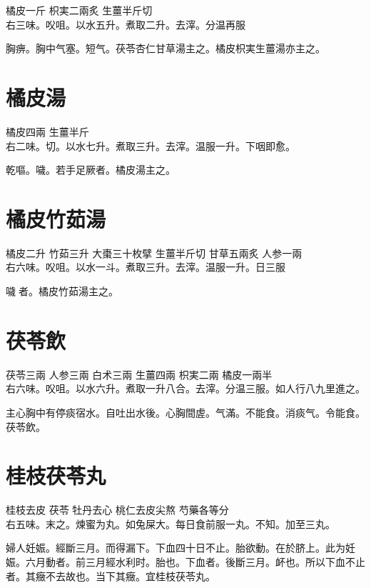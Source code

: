 橘皮{\scriptsize 一斤} 枳実{\scriptsize 二兩炙} 生薑{\scriptsize 半斤切}\\
右三味。㕮咀。以水五升。煮取二升。去滓。分温再服

胸痹。胸中气塞。短气。茯苓杏仁甘草湯主之。橘{\khaaitp 皮}枳{\khaaitp 実生}薑湯亦主之。

\section{橘皮湯}

橘皮{\scriptsize 四兩} 生薑{\scriptsize 半斤}\\
右二味。切。以水七升。煮取三升。去滓。温服一升。下咽即愈。

乾嘔。噦。若手足厥者。橘皮湯主之。

\section{橘皮竹茹湯}

橘皮{\scriptsize 二升} 竹茹{\scriptsize 三升} 大棗{\scriptsize 三十枚擘} 生薑{\scriptsize 半斤切} 甘草{\scriptsize 五兩炙} 人参{\scriptsize 一兩}\\
右六味。㕮咀。以水一斗。煮取三升。去滓。温服一升。日三服

噦{\sungtpii 𠱘}者。橘皮竹茹湯主之。

\section{茯苓飲}

茯苓{\scriptsize 三兩} 人参{\scriptsize 三兩} 白术{\scriptsize 三兩} 生薑{\scriptsize 四兩} 枳実{\scriptsize 二兩} 橘皮{\scriptsize 一兩半}\\
右六味。㕮咀。以水六升。煮取一升八合。去滓。分温三服。如人行八九里進之。

主心胸中有停痰宿水。自吐出水後。心胸間虗。气滿。不能食。消痰气。令能食。茯苓飲。

\section{桂枝茯苓丸}

桂枝{\scriptsize 去皮} 茯苓{ }牡丹{\scriptsize 去心} 桃仁{\scriptsize 去皮尖熬} 芍藥{\scriptsize 各等分}\\
右五味。末之。煉蜜为丸。如兔屎大。每日{\khaaitp 食前服}一丸。不知。加至三丸。

婦人妊娠。經斷三月。而得漏下。下血四十日不止。胎欲動。在於脐上。此为妊娠。六月動者。前三月經水利时。胎也。下血者。後斷三月。衃也。所以下血不止者。其癥不去故也。当下其癥。宜桂枝茯苓丸。{\wuben}

